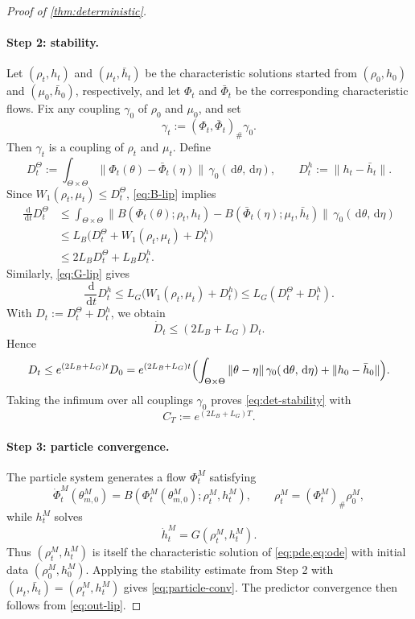 \documentclass[11pt]{article}
\theoremstyle{definition}
\newcommand{\W}{W_1}
\newcommand{\dd}{\,\mathrm{d}}
\begin{document}
\begin{proof}[Proof of \cref{thm:deterministic}]
\paragraph{Step 2: stability.}
Let $(\rho_t,h_t)$ and $(\mu_t,\bar h_t)$ be the characteristic solutions
started from $(\rho_0,h_0)$ and $(\mu_0,\bar h_0)$, respectively, and let
$\Phi_t$ and $\bar\Phi_t$ be the corresponding characteristic flows. Fix any
coupling $\gamma_0$ of $\rho_0$ and $\mu_0$, and set
\[
  \gamma_t:=(\Phi_t,\bar\Phi_t)_\#\gamma_0.
\]
Then $\gamma_t$ is a coupling of $\rho_t$ and $\mu_t$. Define
\[
  D_t^\Theta
  :=
  \int_{\Theta\times\Theta}
  \|\Phi_t(\theta)-\bar\Phi_t(\eta)\|
  \,\gamma_0(\dd\theta,\dd\eta),
  \qquad
  D_t^h:=\|h_t-\bar h_t\|.
\]
Since $\W(\rho_t,\mu_t)\le D_t^\Theta$, \eqref{eq:B-lip} implies
\begin{align*}
  \frac{\dd}{\dd t}D_t^\Theta
  &\le
  \int_{\Theta\times\Theta}
  \|B(\Phi_t(\theta);\rho_t,h_t)-B(\bar\Phi_t(\eta);\mu_t,\bar h_t)\|
  \,\gamma_0(\dd\theta,\dd\eta)\\
  &\le
  L_B\bigl(D_t^\Theta+\W(\rho_t,\mu_t)+D_t^h\bigr)\\
  &\le
  2L_B D_t^\Theta + L_B D_t^h.
\end{align*}
Similarly, \eqref{eq:G-lip} gives
\[
  \frac{\dd}{\dd t}D_t^h
  \le
  L_G\bigl(\W(\rho_t,\mu_t)+D_t^h\bigr)
  \le
  L_G(D_t^\Theta+D_t^h).
\]
With $D_t:=D_t^\Theta+D_t^h$, we obtain
\[
  \dot D_t
  \le
  (2L_B+L_G)D_t.
\]
Hence
\[
  D_t
  \le
  e^{(2L_B+L_G)t}D_0
  =
  e^{(2L_B+L_G)t}
  \Bigl(
    \int_{\Theta\times\Theta}\|\theta-\eta\|\,\gamma_0(\dd\theta,\dd\eta)
    +
    \|h_0-\bar h_0\|
  \Bigr).
\]
Taking the infimum over all couplings $\gamma_0$ proves \eqref{eq:det-stability}
with
\[
  C_T:=e^{(2L_B+L_G)T}.
\]

\paragraph{Step 3: particle convergence.}
The particle system generates a flow $\Phi_t^M$ satisfying
\[
  \dot\Phi_t^M(\theta_{m,0}^M)
  =
  B(\Phi_t^M(\theta_{m,0}^M);\rho_t^M,h_t^M),
  \qquad
  \rho_t^M=(\Phi_t^M)_\#\rho_0^M,
\]
while $h_t^M$ solves
\[
  \dot h_t^M=G(\rho_t^M,h_t^M).
\]
Thus $(\rho_t^M,h_t^M)$ is itself the characteristic solution of
\cref{eq:pde,eq:ode} with initial data $(\rho_0^M,h_0^M)$. Applying the
stability estimate from Step 2 with
\(
  (\mu_t,\bar h_t)=(\rho_t^M,h_t^M)
\)
gives \eqref{eq:particle-conv}. The predictor convergence then follows from
\eqref{eq:out-lip}.
\end{proof}
\end{document}
